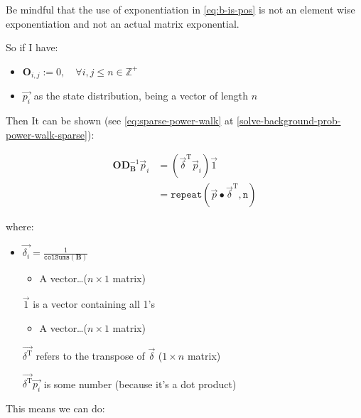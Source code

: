 \documentclass[11pt]{report}
\begin{document}
Be mindful that the use of exponentiation in \eqref{eq:b-is-pos} is not an element wise
exponentiation and not an actual matrix exponential.

So if I have:

\begin{itemize}
\item \(\mathbf{O}_{i, j} := 0, \quad \forall i,j\leq n \in \mathbb{Z}^+\)

\item \(\vec{p_i}\) as the state distribution, being a vector of length \(n\)
\end{itemize}

Then It can be shown (see \eqref{eq:sparse-power-walk} at \ref{solve-background-prob-power-walk-sparse}):

\begin{align}
	\mathbf{O} \mathbf{D}_{\mathbf{B}}^{- 1} \vec{p}_{i} &= \left( \vec{\delta}^{\mathrm{T}} \vec{p}_{i} \right) \vec{1} \\
	&=    \mathtt{repeat} \left( \vec{p} \bullet \vec{\delta}^{\mathrm{T}}, \mathtt{n}  \right)
\end{align}




where:

\begin{itemize}
\item \(\vec{\delta_i} = \frac{1}{\mathtt{colSums} \left( \mathbf{B} \right)}\)
\begin{itemize}
\item A vector\ldots{}(\(n\times 1\) matrix)
\end{itemize}
\item[{\(\vec{1}\) }] is a vector containing all 1's
\begin{itemize}
\item A vector\ldots{}(\(n\times 1\) matrix)
\end{itemize}
\item[{\(\vec{\delta^{\mathrm{T}}}\)}] refers to the transpose of \(\vec{\delta}\) (\(1\times n\) matrix)
\item[{\(\vec{\delta^{\mathrm{T}}} \vec{p_{i}}\)}] is some number (because it's a dot product)
\end{itemize}

This means we can do:
\end{document}
